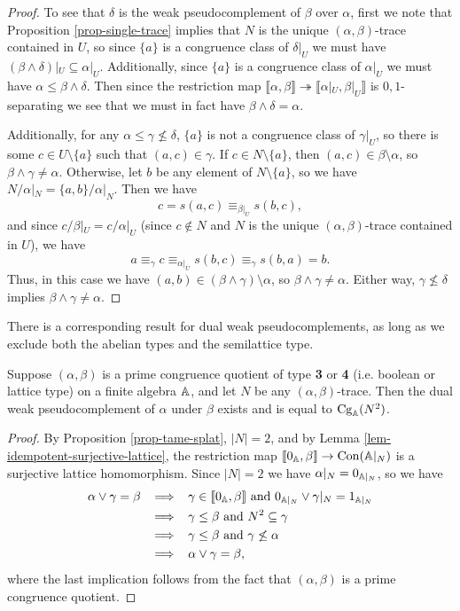 \begin{appendices}
\begin{proof}
To see that $\delta$ is the weak pseudocomplement of $\beta$ over $\alpha$, first we note that Proposition \ref{prop-single-trace} implies that $N$ is the unique $(\alpha,\beta)$-trace contained in $U$, so since $\{a\}$ is a congruence class of $\delta|_U$ we must have $(\beta \wedge \delta)|_U \subseteq \alpha|_U$. Additionally, since $\{a\}$ is a congruence class of $\alpha|_U$ we must have $\alpha \le \beta \wedge \delta$. Then since the restriction map $\llbracket \alpha, \beta \rrbracket \twoheadrightarrow \llbracket \alpha|_U, \beta|_U \rrbracket$ is $0,1$-separating we see that we must in fact have $\beta \wedge \delta = \alpha$.

Additionally, for any $\alpha \le \gamma \not\le \delta$, $\{a\}$ is not a congruence class of $\gamma|_U$, so there is some $c \in U \setminus \{a\}$ such that $(a,c) \in \gamma$. If $c \in N \setminus \{a\}$, then $(a,c) \in \beta \setminus \alpha$, so $\beta \wedge \gamma \ne \alpha$. Otherwise, let $b$ be any element of $N \setminus \{a\}$, so we have $N/\alpha|_N = \{a,b\}/\alpha|_N$. Then we have
\[
c = s(a,c) \equiv_{\beta|_U} s(b,c),
\]
and since $c/\beta|_U = c/\alpha|_U$ (since $c \not\in N$ and $N$ is the unique $(\alpha,\beta)$-trace contained in $U$), we have
\[
a \equiv_\gamma c \equiv_{\alpha|_U} s(b,c) \equiv_\gamma s(b,a) = b.
\]
Thus, in this case we have $(a,b) \in (\beta \wedge \gamma) \setminus \alpha$, so $\beta \wedge \gamma \ne \alpha$. Either way, $\gamma \not\le \delta$ implies $\beta \wedge \gamma \ne \alpha$.
\end{proof}

There is a corresponding result for dual weak pseudocomplements, as long as we exclude both the abelian types and the semilattice type.

\begin{prop}\label{prop-dual-weak-pseudo} Suppose $(\alpha,\beta)$ is a prime congruence quotient of type \textbf{3} or \textbf{4} (i.e. boolean or lattice type) on a finite algebra $\mathbb{A}$, and let $N$ be any $(\alpha,\beta)$-trace. Then the dual weak pseudocomplement of $\alpha$ under $\beta$ exists and is equal to $\operatorname{Cg}_{\mathbb{A}}(N^2)$.
\end{prop}
\begin{proof} By Proposition \ref{prop-tame-splat}, $|N| = 2$, and by Lemma \ref{lem-idempotent-surjective-lattice}, the restriction map $\llbracket 0_{\mathbb{A}}, \beta \rrbracket \rightarrow \operatorname{Con}(\mathbb{A}|_N)$ is a surjective lattice homomorphism. Since $|N| = 2$ we have $\alpha|_N = 0_{\mathbb{A}|_N}$, so we have
\begin{align*}
\alpha \vee \gamma = \beta \;\; &\implies \;\; \gamma \in \llbracket 0_{\mathbb{A}}, \beta \rrbracket \text{ and } 0_{\mathbb{A}|_N} \vee \gamma|_N = 1_{\mathbb{A}|_N}\\
&\implies \;\; \gamma \le \beta \text{ and } N^2 \subseteq \gamma\\
&\implies \;\; \gamma \le \beta \text{ and } \gamma \not\le \alpha\\
&\implies \;\; \alpha \vee \gamma = \beta,
\end{align*}
where the last implication follows from the fact that $(\alpha,\beta)$ is a prime congruence quotient.
\end{proof}


\end{appendices}
